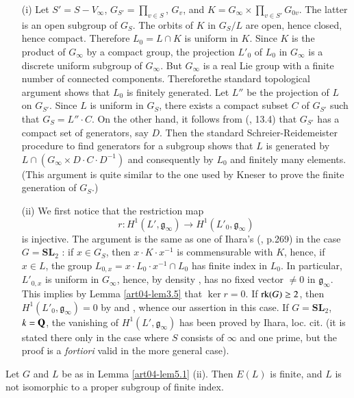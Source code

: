 \begin{itemize}
\item[(i)] Let $S'=S-V_{\infty}$, $G_{S'}=\prod_{v\in S}$, $G_{v}$, and $K=G_{\infty}\times \prod_{v\in S'}G_{0v}$. The latter is an open subgroup of $G_{S}$. The orbits of $K$ in $G_{S}/L$ are open, hence closed, hence compact. Therefore $L_{0}=L\cap K$ is uniform in $K$. Since $K$ is the product of $G_{\infty}$ by a compact group, the projection $L'_{0}$ of $L_{0}$ in $G_{\infty}$ is a discrete uniform subgroup of $G_{\infty}$. But $G_{\infty}$ is a real Lie group with a finite number of connected components. Therefore\pageoriginale the standard topological argument shows that $L_{0}$ is finitely generated. Let $L''$ be the projection of $L$ on $G_{S'}$. Since $L$ is uniform in $G_{S}$, there exists a compact subset $C$ of $G_{S'}$ such that $G_{S}=L''\cdot C.$ On the other hand, it follows from (\cite{art04-key9}, 13.4) that $G_{S'}$ has a compact set of generators, say $D$. Then the standard Schreier-Reidemeister procedure to find generators for a subgroup shows that $L$ is generated by $L\cap (G_{\infty}\times D\cdot C\cdot D^{-1})$ and consequently by $L_{0}$ and finitely many elements. (This argument is quite similar to the one used by Kneser \cite{art04-key17} to prove the finite generation of $G_{S}$.)

\item[(ii)] We first notice that the restriction map 
$$
r:H^{1}(L',\mathfrak{g}_{\infty})\to H^{1}(L'_{0},\mathfrak{g}_{\infty})
$$ 
is injective. The argument is the same as one of Ihara's (\cite{art04-key14}, p.269) in the case $G=\mathbf{SL}_{2}$ : if $x\in G_{S}$, then $x\cdot K\cdot x^{-1}$ is commensurable with $K$, hence, if $x\in L$, the group $L_{0,x}=x\cdot L_{0}\cdot x^{-1}\cap L_{0}$ has finite index in $L_{0}$. In particular, $L'_{0,x}$ is uniform in $G_{\infty}$, hence, by density \cite{art04-key4}, has no fixed vector $\neq 0$ in $\mathfrak{g}_{\infty}$. This implies by Lemma \ref{art04-lem3.5} that $\ker r=0$. If $\operatorname{\mathrm{rk}}(G)\geq 2$, then $H^{1}(L'_{0},\mathfrak{g}_{\infty})=0$ by \cite{art04-key32} and \cite{art04-key33}, whence our assertion in this case. If $G=\mathbf{SL}_{2}$, $k=\mathbf{Q}$, the vanishing of $H^{1}(L',\mathfrak{g}_{\infty})$ has been proved by Ihara, loc. cit. (it is stated there only in the case where $S$ consists of $\infty$ and one prime, but the proof is a {\em fortiori} valid in the more general case).
\end{itemize}

\begin{theorem}\label{art04-thm5.2}
Let $G$ and $L$ be as in Lemma \ref{art04-lem5.1} (ii). Then $E(L)$ is finite, and $L$ is not isomorphic to a proper subgroup of finite index.
\end{theorem}

